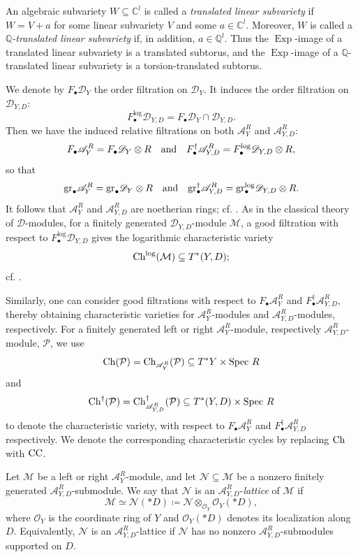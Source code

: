 \documentclass{amsart}
\theoremstyle{plain}
\numberwithin{theorem}{section}
\theoremstyle{definition}
\theoremstyle{remark}
\theoremstyle{definition}
\newcommand{\C}{\mathbb{C}} %
\newcommand{\Q}{\mathbb{Q}}
\newcommand{\cM}{\mathcal{M}}
\newcommand{\cN}{\mathcal{N}}
\newcommand{\cO}{\mathscr{O}}
\newcommand{\cP}{\mathcal{P}}
\newcommand{\gr}{\textup{gr}}
\newcommand{\sA}{\mathscr{A}}
\newcommand{\shD}{\mathscr{D}}
\newcommand{\Spec}{\textup{Spec }}
\newcommand{\Ch}{\textup{Ch}}
\newcommand{\CC}{\textup{CC}}
\begin{document}
An algebraic subvariety $W\subseteq \C^l$ is called a \emph{translated linear subvariety} if $W=V+a$ for some linear subvariety $V$ and some $a\in \C^l$. Moreover, $W$ is called a \emph{$\Q$-translated linear subvariety} if, in addition, $a\in \Q^l$. Thus the $\operatorname{Exp}$-image of a translated linear subvariety is a translated subtorus, and the $\operatorname{Exp}$-image of a $\Q$-translated linear subvariety is a torsion-translated subtorus.

We denote by $F_\bullet\shD_Y$ the order filtration on $\shD_Y$. It induces the order filtration on $\shD_{Y,D}$:
\[
F^{\log}_\bullet\shD_{Y,D}
=
F_\bullet\shD_Y\cap \shD_{Y,D}.
\]
Then we have the induced relative filtrations on both $\sA^R_Y$ and $\sA^R_{Y,D}$:
\[
F_\bullet\sA_Y^R
=
F_\bullet\shD_Y\otimes R
\quad \textup{and} \quad
F^\dagger_\bullet\sA_{Y,D}^R
=
F^{\log}_\bullet\shD_{Y,D}\otimes R,
\]
so that
\[
\gr_\bullet\sA_Y^R
=
\gr_\bullet\shD_Y\otimes R
\quad \textup{and} \quad
\gr^\dagger_\bullet\sA_{Y,D}^R
=
\gr^{\log}_\bullet\shD_{Y,D}\otimes R.
\]
It follows that $\sA_Y^R$ and $\sA^R_{Y,D}$ are noetherian rings; cf. \cite[A.III 1.27]{BJ}. As in the classical theory of $\shD$-modules, for a finitely generated $\shD_{Y,D}$-module $\cM$, a good filtration with respect to $F^{\log}_\bullet\shD_{Y,D}$ gives the logarithmic characteristic variety
\[
\Ch^{\log}(\cM)\subseteq T^*(Y,D);
\]
cf. \cite[\S 2]{WZ}.

Similarly, one can consider good filtrations with respect to $F_\bullet\sA_Y^R$ and $F^\dagger_\bullet\sA_{Y,D}^R$, thereby obtaining characteristic varieties for $\sA^R_Y$-modules and $\sA^R_{Y,D}$-modules, respectively. For a finitely generated left or right $\sA_Y^R$-module, respectively $\sA_{Y,D}^R$-module, $\cP$, we use
\[
\Ch(\cP)
=
\Ch_{\sA_Y^R}(\cP)
\subseteq T^*Y\times \Spec R
\]
and
\[
\Ch^\dagger(\cP)
=
\Ch^\dagger_{\sA_{Y,D}^R}(\cP)
\subseteq T^*(Y,D)\times \Spec R
\]
to denote the characteristic variety, with respect to $F_\bullet\sA_Y^R$ and $F^\dagger_\bullet\sA_{Y,D}^R$ respectively. We denote the corresponding characteristic cycles by replacing $\Ch$ with $\CC$.

Let $\cM$ be a left or right $\sA^R_Y$-module, and let $\cN\subseteq \cM$ be a nonzero finitely generated $\sA^R_{Y,D}$-submodule. We say that $\cN$ is an $\sA^R_{Y,D}$-\emph{lattice} of $\cM$ if
\[
\cM\simeq \cN(*D)
\coloneqq
\cN\otimes_{\cO_Y}\cO_Y(*D),
\]
where $\cO_Y$ is the coordinate ring of $Y$ and $\cO_Y(*D)$ denotes its localization along $D$. Equivalently, $\cN$ is an $\sA^R_{Y,D}$-lattice if $\cN$ has no nonzero $\sA^R_{Y,D}$-submodules supported on $D$.
\end{document}
